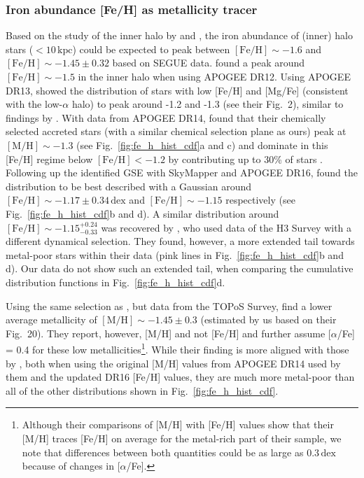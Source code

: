 \documentclass[fleqn,usenatbib]{mnras}
\newcommand{\dex}{\,\mathrm{dex}}	%
\newcommand{\kpc}{\,\mathrm{kpc}}	%
\begin{document}
\subsubsection{Iron abundance [Fe/H] as metallicity tracer} \label{sec:gse_stellar_chemistry_fe_h}

Based on the study of the inner halo by \citet{Carollo2007} and \citet{Ivezic2008}, the iron abundance of (inner) halo stars ($<10\kpc$) could be expected to peak between $\mathrm{[Fe/H]} \sim -1.6$ and $\mathrm{[Fe/H]} \sim -1.45\pm0.32$ based on SEGUE data. \citet{FernandezAlvar2017} found a peak around $\mathrm{[Fe/H]} \sim -1.5$ in the inner halo when using APOGEE DR12. Using APOGEE DR13, \citet{Hayes2018} showed the distribution of stars with low [Fe/H] and [Mg/Fe] (consistent with the low-$\alpha$ halo) to peak around -1.2 and -1.3 (see their Fig.~2), similar to findings by \citet{Matsuno2019}. With data from APOGEE DR14, \citet{Das2020} found that their chemically selected accreted stars (with a similar chemical selection plane as ours) peak at $\mathrm{[M/H]} \sim -1.3$ (see Fig.~\ref{fig:fe_h_hist_cdf}a and c) and dominate in this [Fe/H] regime below $\mathrm{[Fe/H]} < -1.2$ by contributing up to 30\% of stars \citep[see also][]{Mackereth2019,Naidu2020}. Following up the identified GSE with SkyMapper and APOGEE DR16, \citet{Feuillet2020, Feuillet2021} found the distribution to be best described with a Gaussian around $\mathrm{[Fe/H]} \sim -1.17 \pm 0.34\dex$ and $\mathrm{[Fe/H]} \sim -1.15$ respectively (see Fig.~\ref{fig:fe_h_hist_cdf}b and d). A similar distribution around $\mathrm{[Fe/H]} \sim -1.15_{-0.33}^{+0.24}$ was recovered by \citet{Naidu2020}, who used data of the H3 Survey with a different dynamical selection. They found, however, a more extended tail towards metal-poor stars within their data (pink lines in Fig.~\ref{fig:fe_h_hist_cdf}b and d). Our data do not show such an extended tail, when comparing the cumulative distribution functions in Fig.~\ref{fig:fe_h_hist_cdf}d.

Using the same selection as \citet{Feuillet2020}, but data from the TOPoS Survey, \citet{Bonifacio2021} find a lower average metallicity of $\mathrm{[M/H]} \sim -1.45 \pm 0.3$ (estimated by us based on their Fig.~20). They report, however, [M/H] and not [Fe/H] and further assume [$\alpha$/Fe] = 0.4 for these low metallicities\footnote{Although their comparisons of [M/H] with [Fe/H] values show that their [M/H] traces [Fe/H] on average for the metal-rich part of their sample, we note that differences between both quantities could be as large as $0.3\dex$ because of changes in [$\alpha$/Fe].}. While their finding is more aligned with those by \citet{Das2020}, both when using the original [M/H] values from APOGEE DR14 used by them and the updated DR16 [Fe/H] values, they are much more metal-poor than all of the other distributions shown in Fig.~\ref{fig:fe_h_hist_cdf}.
\end{document}
